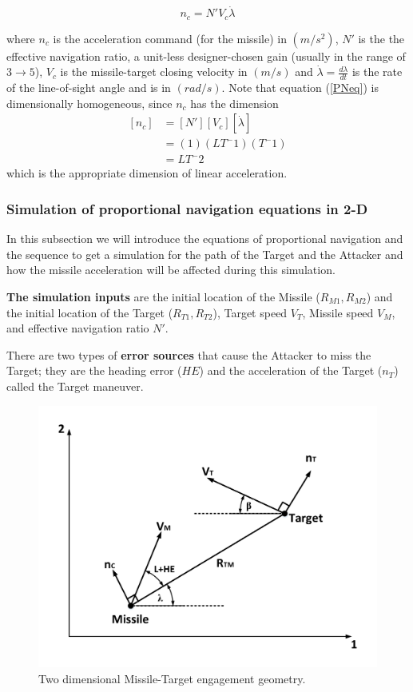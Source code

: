 \begin{equation}
n_c= N' V_c \dot{\lambda}
\label{PNeq}
\end{equation}

where $n_c$ is the acceleration command (for the missile) in $(m/s^2)$, $N'$ is the the effective navigation ratio, a unit-less designer-chosen gain (usually in the range of $3 \to 5$), $V_c$ is the missile-target closing velocity in $(m/s)$ and $\dot{\lambda} = \frac{d\lambda}{dt}$ is the rate of the line-of-sight angle and is in $(rad/s)$. Note that equation (\ref{PNeq}) is dimensionally homogeneous, since $n_c$ has the dimension
\begin{equation}
\begin{split}
[n_c] &= [N'] [V_c] [\dot{\lambda}]\\
&=(1) (LT^-1) (T^-1)\\
&=LT^-2
\end{split}
\label{PN dimensionallity}
\end{equation}
which is the appropriate dimension of linear acceleration.

\subsubsection{Simulation of proportional navigation equations in 2-D}
\label{PNeqations}
In this subsection we will introduce the equations of proportional navigation and the sequence to get a simulation for the path of the Target and the Attacker and how the missile acceleration will be affected during this simulation.

\textbf{The simulation inputs} are the initial location of the Missile ($R_{M1}, R_{M2}$) and the initial location of the Target ($R_{T1}, R_{T2}$), Target speed $V_T$, Missile speed $V_M$, and effective navigation ratio $N'$.

There are two types of \textbf{error sources} that cause the Attacker to miss the Target; they are the heading error ($HE$) and the acceleration of the Target ($n_T$) called the Target maneuver.

\begin{figure}[htb]
	\centering
	\includegraphics[scale = 0.6]{fig/PN.pdf}
	\caption{Two dimensional Missile-Target engagement geometry.}
	\label{PN}
\end{figure}


